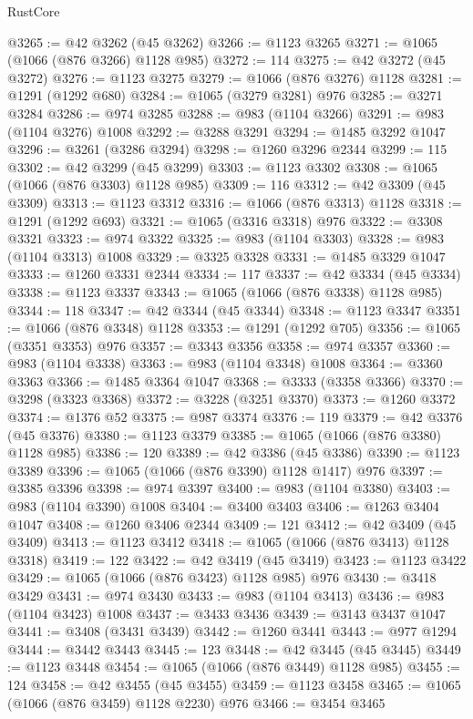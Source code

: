 \begin{lexlean}{RustCore}
\begin{coremodule}
@3265 := @42 @3262 (@45 @3262)
@3266 := @1123 @3265
@3271 := @1065 (@1066 (@876 @3266) @1128 @985)
@3272 := 114
@3275 := @42 @3272 (@45 @3272)
@3276 := @1123 @3275
@3279 := @1066 (@876 @3276) @1128
@3281 := @1291 (@1292 @680)
@3284 := @1065 (@3279 @3281) @976
@3285 := @3271 @3284
@3286 := @974 @3285
@3288 := @983 (@1104 @3266)
@3291 := @983 (@1104 @3276) @1008
@3292 := @3288 @3291
@3294 := @1485 @3292 @1047
@3296 := @3261 (@3286 @3294)
@3298 := @1260 @3296 @2344
@3299 := 115
@3302 := @42 @3299 (@45 @3299)
@3303 := @1123 @3302
@3308 := @1065 (@1066 (@876 @3303) @1128 @985)
@3309 := 116
@3312 := @42 @3309 (@45 @3309)
@3313 := @1123 @3312
@3316 := @1066 (@876 @3313) @1128
@3318 := @1291 (@1292 @693)
@3321 := @1065 (@3316 @3318) @976
@3322 := @3308 @3321
@3323 := @974 @3322
@3325 := @983 (@1104 @3303)
@3328 := @983 (@1104 @3313) @1008
@3329 := @3325 @3328
@3331 := @1485 @3329 @1047
@3333 := @1260 @3331 @2344
@3334 := 117
@3337 := @42 @3334 (@45 @3334)
@3338 := @1123 @3337
@3343 := @1065 (@1066 (@876 @3338) @1128 @985)
@3344 := 118
@3347 := @42 @3344 (@45 @3344)
@3348 := @1123 @3347
@3351 := @1066 (@876 @3348) @1128
@3353 := @1291 (@1292 @705)
@3356 := @1065 (@3351 @3353) @976
@3357 := @3343 @3356
@3358 := @974 @3357
@3360 := @983 (@1104 @3338)
@3363 := @983 (@1104 @3348) @1008
@3364 := @3360 @3363
@3366 := @1485 @3364 @1047
@3368 := @3333 (@3358 @3366)
@3370 := @3298 (@3323 @3368)
@3372 := @3228 (@3251 @3370)
@3373 := @1260 @3372
@3374 := @1376 @52
@3375 := @987 @3374
@3376 := 119
@3379 := @42 @3376 (@45 @3376)
@3380 := @1123 @3379
@3385 := @1065 (@1066 (@876 @3380) @1128 @985)
@3386 := 120
@3389 := @42 @3386 (@45 @3386)
@3390 := @1123 @3389
@3396 := @1065 (@1066 (@876 @3390) @1128 @1417) @976
@3397 := @3385 @3396
@3398 := @974 @3397
@3400 := @983 (@1104 @3380)
@3403 := @983 (@1104 @3390) @1008
@3404 := @3400 @3403
@3406 := @1263 @3404 @1047
@3408 := @1260 @3406 @2344
@3409 := 121
@3412 := @42 @3409 (@45 @3409)
@3413 := @1123 @3412
@3418 := @1065 (@1066 (@876 @3413) @1128 @3318)
@3419 := 122
@3422 := @42 @3419 (@45 @3419)
@3423 := @1123 @3422
@3429 := @1065 (@1066 (@876 @3423) @1128 @985) @976
@3430 := @3418 @3429
@3431 := @974 @3430
@3433 := @983 (@1104 @3413)
@3436 := @983 (@1104 @3423) @1008
@3437 := @3433 @3436
@3439 := @3143 @3437 @1047
@3441 := @3408 (@3431 @3439)
@3442 := @1260 @3441
@3443 := @977 @1294
@3444 := @3442 @3443
@3445 := 123
@3448 := @42 @3445 (@45 @3445)
@3449 := @1123 @3448
@3454 := @1065 (@1066 (@876 @3449) @1128 @985)
@3455 := 124
@3458 := @42 @3455 (@45 @3455)
@3459 := @1123 @3458
@3465 := @1065 (@1066 (@876 @3459) @1128 @2230) @976
@3466 := @3454 @3465

\end{coremodule}
\end{lexlean}
